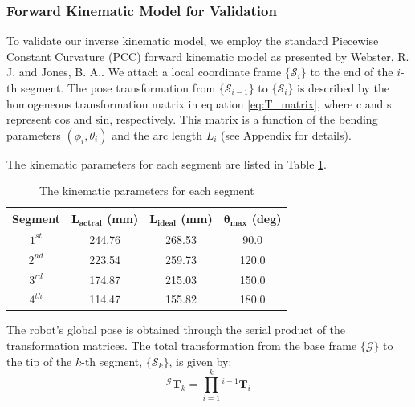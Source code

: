 \documentclass[conference]{IEEEtran}
\begin{document}
\subsubsection{Forward Kinematic Model for Validation}
To validate our inverse kinematic model, we employ the standard Piecewise Constant Curvature (PCC) forward kinematic model as presented by Webster, R. J. and Jones, B. A.\cite{b7}. We attach a local coordinate frame $\{\mathcal{S}_i\}$ to the end of the $i$-th segment. The pose transformation from $\{\mathcal{S}_{i-1}\}$ to $\{\mathcal{S}_i\}$ is described by the homogeneous transformation matrix in equation \eqref{eq:T_matrix}, where c and s represent cos and sin, respectively. This matrix is a function of the bending parameters $(\phi_i, \theta_i)$ and the arc length $L_i$ (see Appendix for details).

The kinematic parameters for each segment are listed in Table \ref{tab:kinematic_params}.

\begin{table}[h]
    \caption{The kinematic parameters for each segment}
    \label{tab:kinematic_params}
    \centering
    \begin{tabular}{cccc}
        \toprule
        \textbf{Segment} & $\boldsymbol{L_{actral}}$ \textbf{(mm)} & $\boldsymbol{L_{ideal}}$ \textbf{(mm)} & $\boldsymbol{\theta_{max}}$ \textbf{(deg)} \\
        \midrule
        $1^{st}$ & 244.76 & 268.53 & 90.0 \\
        $2^{nd}$ & 223.54 & 259.73 & 120.0 \\
        $3^{rd}$ & 174.87 & 215.03 & 150.0 \\
        $4^{th}$ & 114.47 & 155.82 & 180.0 \\
        \bottomrule
    \end{tabular}
\end{table}

The robot's global pose is obtained through the serial product of the transformation matrices. The total transformation from the base frame $\{\mathcal{G}\}$ to the tip of the $k$-th segment, $\{\mathcal{S}_k\}$, is given by: 
\begin{equation}
    {^\mathcal{G}\mathbf{T}_k} = \prod_{i=1}^{k} {^{i-1}\mathbf{T}_i}
    \label{eq:T_global}
    \tag{12}
\end{equation}
\end{document}
